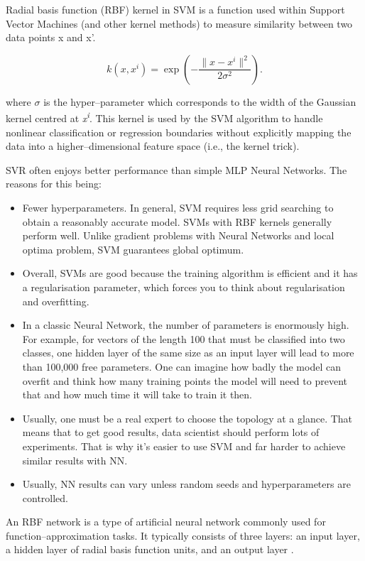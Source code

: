 \documentclass[12pt,a4paper]{report}
\numberwithin{equation}{section}
\begin{document}
Radial basis function (RBF) kernel in SVM is a function used within
Support Vector Machines (and other kernel methods) to measure similarity
between two data points x and x'.

\begin{equation}\label{eq:2.1.34}
k(x, x^{i}) = \exp\!\left(-\frac{\|x - x^{i}\|^{2}}{2\sigma^{2}}\right).
\end{equation}


where \emph{$\sigma$} is the hyper--parameter which corresponds to the width of
the Gaussian kernel centred at \emph{x\textsuperscript{i}}. This kernel
is used by the SVM algorithm to handle nonlinear classification or
regression boundaries without explicitly mapping the data into a
higher--dimensional feature space (i.e., the kernel trick).

SVR often enjoys better performance than simple MLP Neural Networks. The
reasons for this being:

\begin{itemize}
\item
  Fewer hyperparameters. In general, SVM requires less grid searching to
  obtain a reasonably accurate model. SVMs with RBF kernels generally
  perform well. Unlike gradient problems with Neural Networks and local
  optima problem, SVM guarantees global optimum.
\item
  Overall, SVMs are good because the training algorithm is efficient and
  it has a regularisation parameter, which forces you to think about
  regularisation and overfitting.
\item
  In a classic Neural Network, the number of parameters is enormously
  high. For example, for vectors of the length 100 that must be
  classified into two classes, one hidden layer of the same size as an
  input layer will lead to more than 100,000 free parameters. One can
  imagine how badly the model can overfit and think how many training
  points the model will need to prevent that and how much time it will
  take to train it then.
\item
  Usually, one must be a real expert to choose the topology at a glance.
  That means that to get good results, data scientist should perform
  lots of experiments. That is why it's easier to use SVM and far harder
  to achieve similar results with NN.
\item
  Usually, NN results can vary unless random seeds and hyperparameters
  are controlled.
\end{itemize}

An RBF network is a type of artificial neural network commonly used for
function--approximation tasks. It typically consists of three layers: an
input layer, a hidden layer of radial basis function units, and an
output layer \cite{haykin1999neural_46}.
\end{document}
